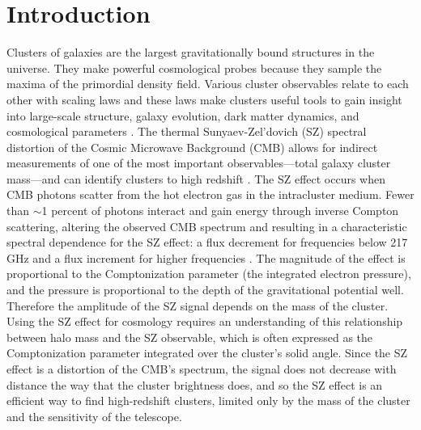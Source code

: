 \documentclass[a4paper,fleqn,usenatbib]{mnras}
\begin{document}
\begin{keywords}

\end{keywords}




\section{Introduction}
Clusters of galaxies are the largest gravitationally bound structures in the universe. They make powerful cosmological probes because they sample the maxima of the primordial density field.  Various cluster observables relate to each other with scaling laws and these laws make clusters useful tools to gain insight into large-scale structure, galaxy evolution, dark matter dynamics, and cosmological parameters \citep{2005RvMP...77..207V,2013SSRv..177..247G}. The thermal Sunyaev-Zel'dovich (SZ) spectral distortion of the Cosmic Microwave Background (CMB) allows for indirect measurements of one of the most important observables---total galaxy cluster mass---and can identify clusters to high redshift \citep{1972CoASP...4..173S, 2002ARA&A..40..643C}. 
The SZ effect occurs when CMB photons scatter from the hot electron gas in the intracluster medium. Fewer than $\sim$1 percent of photons interact and gain energy through inverse Compton scattering, altering the observed CMB spectrum and resulting in a characteristic spectral dependence for the SZ effect: a flux decrement for frequencies below 217 GHz and a flux increment for higher frequencies \citep{1999PhR...310...97B,2002ARA&A..40..643C}.
The magnitude of the effect is proportional to the Comptonization parameter (the integrated electron pressure), and the pressure is proportional to the depth of the gravitational potential well.  Therefore the amplitude of the SZ signal depends on the mass of the cluster.
Using the SZ effect for cosmology requires an understanding of this relationship between halo mass and the SZ observable, which is often expressed as the Comptonization parameter integrated over the cluster's solid angle. 
Since the SZ effect is a distortion of the CMB's spectrum, the signal does not decrease with distance the way that the cluster brightness does, and so the SZ effect is an efficient way to find high-redshift clusters, limited only by the mass of the cluster and the sensitivity of the telescope.
\end{document}
